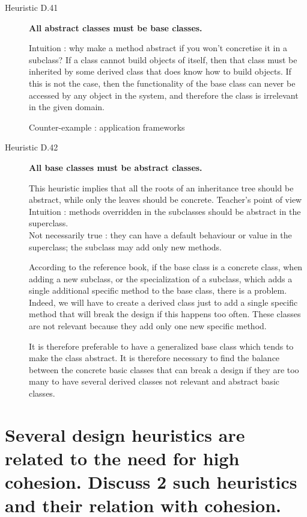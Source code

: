 \begin{description}
\item[Heuristic D.41] \textbf{All abstract classes must be base classes.}

Intuition : why make a method abstract if you won’t concretise it in a subclass?
If a class cannot build objects of itself, then that class must be inherited by some derived class that does know how to build objects. If this is not the case, then the functionality of the base class can never be accessed by any object in the system, and therefore the class is irrelevant in the given domain.

Counter-example : application frameworks

\item[Heuristic D.42] \textbf{All base classes must be abstract classes.}

This heuristic implies that all the roots of an inheritance tree should be abstract, while only the leaves should be concrete.
Teacher's point of view \\
Intuition : methods overridden in the subclasses should be abstract in the superclass. \\
Not necessarily true :
they can have a default behaviour or value in the superclass; the subclass may add only new methods.


According to the reference book, if the base class is a concrete class, when adding a new subclass, or the specialization of a subclass, which adds a single additional specific method to the base class, there is a problem. Indeed, we will have to create a derived class just to add a single specific method that will break the design if this happens too often. These classes are not relevant because they add only one new specific method.

It is therefore preferable to have a generalized base class which tends to make the class abstract. It is therefore necessary to find the balance between the concrete basic classes that can break a design if they are too many to have several derived classes not relevant and abstract basic classes.

\end{description}



\section{Several design heuristics are related to the need for high cohesion. Discuss 2 such
heuristics and their relation with cohesion.}

